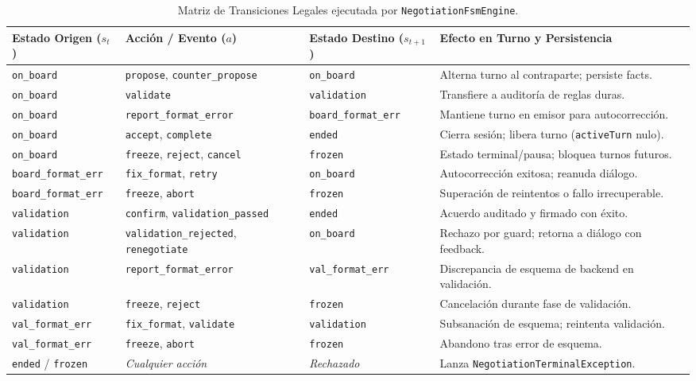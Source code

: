 \begin{table}[htbp]
\centering
\small
\begin{tabular}{lp{4.2cm}lp{4.8cm}}
\toprule
\textbf{Estado Origen ($s_t$)} & \textbf{Acción / Evento ($a$)} & \textbf{Estado Destino ($s_{t+1}$)} & \textbf{Efecto en Turno y Persistencia} \\
\midrule
\texttt{on\_board} & \texttt{propose}, \texttt{counter\_propose} & \texttt{on\_board} & Alterna turno al contraparte; persiste facts. \\
\texttt{on\_board} & \texttt{validate} & \texttt{validation} & Transfiere a auditoría de reglas duras. \\
\texttt{on\_board} & \texttt{report\_format\_error} & \texttt{board\_format\_err} & Mantiene turno en emisor para autocorrección. \\
\texttt{on\_board} & \texttt{accept}, \texttt{complete} & \texttt{ended} & Cierra sesión; libera turno (\texttt{activeTurn} nulo). \\
\texttt{on\_board} & \texttt{freeze}, \texttt{reject}, \texttt{cancel} & \texttt{frozen} & Estado terminal/pausa; bloquea turnos futuros. \\
\midrule
\texttt{board\_format\_err} & \texttt{fix\_format}, \texttt{retry} & \texttt{on\_board} & Autocorrección exitosa; reanuda diálogo. \\
\texttt{board\_format\_err} & \texttt{freeze}, \texttt{abort} & \texttt{frozen} & Superación de reintentos o fallo irrecuperable. \\
\midrule
\texttt{validation} & \texttt{confirm}, \texttt{validation\_passed} & \texttt{ended} & Acuerdo auditado y firmado con éxito. \\
\texttt{validation} & \texttt{validation\_rejected}, \texttt{renegotiate} & \texttt{on\_board} & Rechazo por guard; retorna a diálogo con feedback. \\
\texttt{validation} & \texttt{report\_format\_error} & \texttt{val\_format\_err} & Discrepancia de esquema de backend en validación. \\
\texttt{validation} & \texttt{freeze}, \texttt{reject} & \texttt{frozen} & Cancelación durante fase de validación. \\
\midrule
\texttt{val\_format\_err} & \texttt{fix\_format}, \texttt{validate} & \texttt{validation} & Subsanación de esquema; reintenta validación. \\
\texttt{val\_format\_err} & \texttt{freeze}, \texttt{abort} & \texttt{frozen} & Abandono tras error de esquema. \\
\midrule
\texttt{ended} / \texttt{frozen} & \textit{Cualquier acción} & \textit{Rechazado} & Lanza \texttt{NegotiationTerminalException}. \\
\bottomrule
\end{tabular}
\caption{Matriz de Transiciones Legales ejecutada por \texttt{NegotiationFsmEngine}.}
\label{tab:fsm_transition_matrix}
\end{table}

